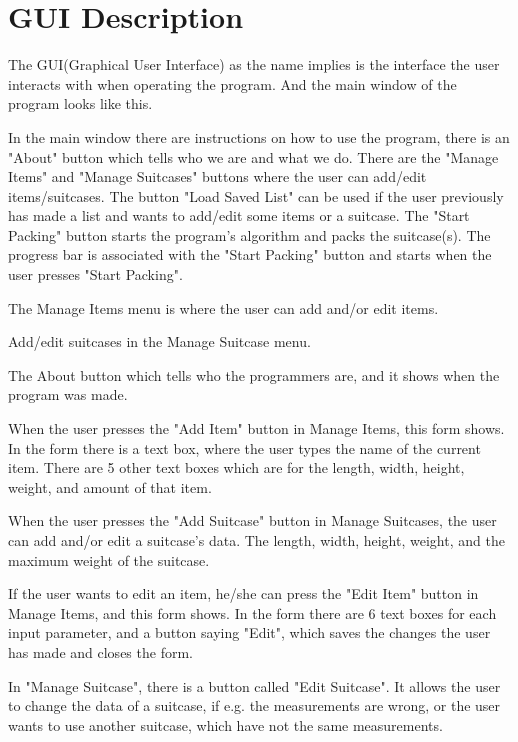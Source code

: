 \section{GUI Description}

The GUI(Graphical User Interface) as the name implies is the interface the user interacts with when operating the program.
And the main window of the program looks like this.


In the main window there are instructions on how to use the program, there is an "About" button which tells who we are and what we do. There are the "Manage Items" and "Manage Suitcases" buttons where the user can add/edit items/suitcases. The button "Load Saved List" can be used if the user previously has made a list and wants to add/edit some items or a suitcase. The "Start Packing" button starts the program's algorithm and packs the suitcase(s). The progress bar is associated with the "Start Packing" button and starts when the user presses "Start Packing".

The Manage Items menu is where the user can add and/or edit items.

Add/edit suitcases in the Manage Suitcase menu.

The About button which tells who the programmers are, and it shows when the program was made.

When the user presses the "Add Item" button in Manage Items, this form shows. In the form there is a text box, where the user types the name of the current item. There are 5 other text boxes which are for the length, width, height, weight, and amount of that item.

When the user presses the "Add Suitcase" button in Manage Suitcases, the user can add and/or edit a suitcase's data. The length, width, height, weight, and the maximum weight of the suitcase. 

If the user wants to edit an item, he/she can press the "Edit Item" button in Manage Items, and this form shows. In the form there are 6 text boxes for each input parameter, and a button saying "Edit", which saves the changes the user has made and closes the form.

In "Manage Suitcase", there is a button called "Edit Suitcase". It allows the user to change the data of a suitcase, if e.g. the measurements are wrong, or the user wants to use another suitcase, which have not the same measurements.

